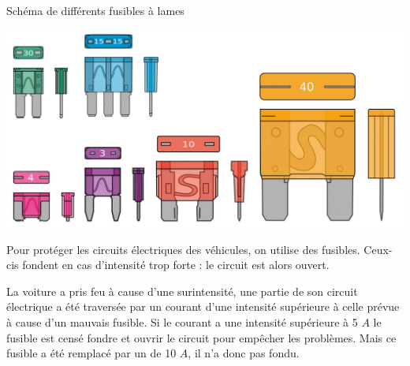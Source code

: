 \begin{doc}[h!]
	\caption{Schéma de différents fusibles à lames}
	
	\begin{center}
		\includegraphics[scale=0.3]{img/fusibles}
	\end{center}
	
	Pour protéger les circuits électriques des véhicules, on utilise des fusibles. Ceux-cis fondent en cas d'intensité trop forte : le circuit est alors ouvert.
\end{doc}

\begin{solution}
	La voiture a pris feu à cause d'une surintensité, une partie de son circuit électrique a été traversée par un courant d'une intensité supérieure à celle prévue à cause d'un mauvais fusible.
	Si le courant a une intensité supérieure à 5 $A$ le fusible est censé fondre et ouvrir le circuit pour empêcher les problèmes. Mais ce fusible a été remplacé par un de 10 $A$, il n'a donc pas fondu.
\end{solution}